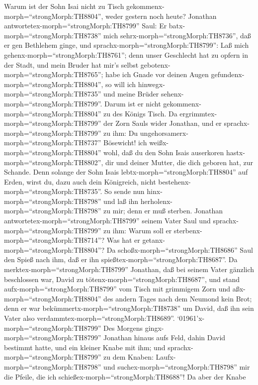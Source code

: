Warum ist der Sohn Isai nicht zu Tisch
gekommenx-morph=``strongMorph:TH8804'', weder gestern noch heute?
 Jonathan antwortetex-morph=``strongMorph:TH8799'' Saul: Er
batx-morph=``strongMorph:TH8738'' mich
sehrx-morph=``strongMorph:TH8736'', daß er gen Bethlehem ginge,
 und sprachx-morph=``strongMorph:TH8799'': Laß mich
gehenx-morph=``strongMorph:TH8761''; denn unser Geschlecht hat zu opfern
in der Stadt, und mein Bruder hat mir's selbst
gebotenx-morph=``strongMorph:TH8765''; habe ich Gnade vor deinen Augen
gefundenx-morph=``strongMorph:TH8804'', so will ich
hinwegx-morph=``strongMorph:TH8735'' und meine Brüder
sehenx-morph=``strongMorph:TH8799''. Darum ist er nicht
gekommenx-morph=``strongMorph:TH8804'' zu des Königs Tisch.
 Da ergrimmtex-morph=``strongMorph:TH8799'' der Zorn Sauls
wider Jonathan, und er sprachx-morph=``strongMorph:TH8799'' zu ihm: Du
ungehorsamerx-morph=``strongMorph:TH8737'' Bösewicht! ich
weißx-morph=``strongMorph:TH8804'' wohl, daß du den Sohn Isais
auserkoren hastx-morph=``strongMorph:TH8802'', dir und deiner Mutter,
die dich geboren hat, zur Schande.  Denn solange der Sohn
Isais lebtx-morph=``strongMorph:TH8804'' auf Erden, wirst du, dazu auch
dein Königreich, nicht bestehenx-morph=``strongMorph:TH8735''. So sende
nun hinx-morph=``strongMorph:TH8798'' und laß ihn
herholenx-morph=``strongMorph:TH8798'' zu mir; denn er muß sterben.
 Jonathan antwortetex-morph=``strongMorph:TH8799'' seinem
Vater Saul und sprachx-morph=``strongMorph:TH8799'' zu ihm: Warum soll
er sterbenx-morph=``strongMorph:TH8714''? Was hat er
getanx-morph=``strongMorph:TH8804''?  Da
schoßx-morph=``strongMorph:TH8686'' Saul den Spieß nach ihm, daß er ihn
spießtex-morph=``strongMorph:TH8687''. Da
merktex-morph=``strongMorph:TH8799'' Jonathan, daß bei seinem Vater
gänzlich beschlossen war, David zu tötenx-morph=``strongMorph:TH8687'',
 und stand aufx-morph=``strongMorph:TH8799'' vom Tisch mit
grimmigem Zorn und aßx-morph=``strongMorph:TH8804'' des andern Tages
nach dem Neumond kein Brot; denn er war
bekümmertx-morph=``strongMorph:TH8738'' um David, daß ihn sein Vater
also verdammtex-morph=``strongMorph:TH8689''. 
`01961'\textbar x-morph=``strongMorph:TH8799'' Des Morgens
gingx-morph=``strongMorph:TH8799'' Jonathan hinaus aufs Feld, dahin
David bestimmt hatte, und ein kleiner Knabe mit ihm;  und
sprachx-morph=``strongMorph:TH8799'' zu dem Knaben:
Laufx-morph=``strongMorph:TH8798'' und
suchex-morph=``strongMorph:TH8798'' mir die Pfeile, die ich
schießex-morph=``strongMorph:TH8688''! Da aber der Knabe

